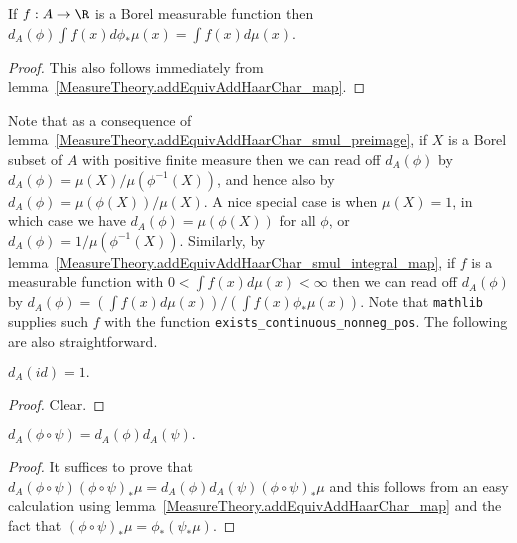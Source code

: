 \begin{lemma}
  \label{MeasureTheory.addEquivAddHaarChar_smul_integral_map}
  \leanok
  If $f:A\to\R$ is a Borel measurable function then
  $d_A(\phi)\int f(x)d\phi_*\mu(x)=\int f(x)d\mu(x)$.
\end{lemma}
\begin{proof}
  This also follows immediately from lemma~\ref{MeasureTheory.addEquivAddHaarChar_map}.
\end{proof}

Note that as a consequence of lemma~\ref{MeasureTheory.addEquivAddHaarChar_smul_preimage},
if $X$ is a Borel subset of $A$ with positive finite measure then we can read
off $d_A(\phi)$ by $d_A(\phi)=\mu(X)/\mu(\phi^{-1}(X))$, and hence also by
$d_A(\phi)=\mu(\phi(X))/\mu(X)$. A nice special case is when
$\mu(X)=1$, in which case we have $d_A(\phi)=\mu(\phi(X))$ for all $\phi$,
or $d_A(\phi)=1/\mu(\phi^{-1}(X))$.
Similarly, by lemma~\ref{MeasureTheory.addEquivAddHaarChar_smul_integral_map},
if $f$ is a measurable function with $0<\int f(x)d\mu(x)<\infty$ then
we can read off $d_A(\phi)$ by $d_A(\phi)=(\int f(x)d\mu(x))/(\int f(x)\phi_*\mu(x))$.
Note that {\tt mathlib} supplies such $f$ with the function {\tt exists\_continuous\_nonneg\_pos}.
The following are also straightforward.

\begin{lemma}
  \label{MeasureTheory.addEquivAddHaarChar_refl}
  \leanok
  $d_A(id)=1.$
\end{lemma}
\begin{proof}
  \leanok
  Clear.
\end{proof}

\begin{lemma}
  \label{MeasureTheory.addEquivAddHaarChar_trans}
  \leanok
  $d_A(\phi\circ\psi)=d_A(\phi)d_A(\psi).$
\end{lemma}
\begin{proof}
  It suffices to prove that $d_A(\phi\circ\psi)(\phi\circ\psi)_*\mu=d_A(\phi)d_A(\psi)(\phi\circ\psi)_*\mu$
  and this follows from an easy calculation using lemma~\ref{MeasureTheory.addEquivAddHaarChar_map}
  and the fact that $(\phi\circ\psi)_*\mu=\phi_*(\psi_*\mu)$.
\end{proof}

